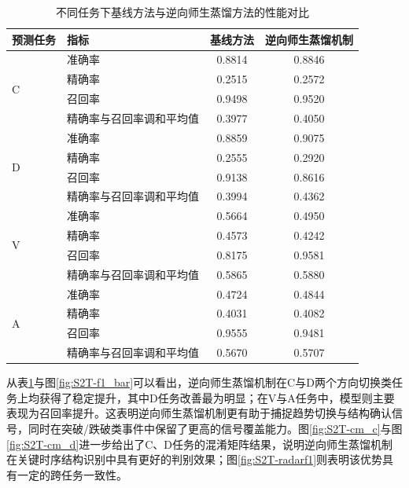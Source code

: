 \begin{table}[htbp]
\centering
\caption{不同任务下基线方法与逆向师生蒸馏方法的性能对比}
\label{tab:s2t-performance}
\begin{tabular}{llcc}
\hline
\textbf{预测任务} & \textbf{指标} & \textbf{基线方法} & \textbf{逆向师生蒸馏机制} \\
\hline
\multirow{4}{*}{C} & 准确率  & 0.8814 & 0.8846 \\
                   & 精确率 & 0.2515 & 0.2572 \\
                   & 召回率    & 0.9498 & 0.9520 \\
                   & 精确率与召回率调和平均值        & 0.3977 & 0.4050 \\
\hline
\multirow{4}{*}{D} & 准确率  & 0.8859 & 0.9075 \\
                   & 精确率 & 0.2555 & 0.2920 \\
                   & 召回率    & 0.9138 & 0.8616 \\
                   & 精确率与召回率调和平均值        & 0.3994 & 0.4362 \\
\hline
\multirow{4}{*}{V} & 准确率  & 0.5664 & 0.4950 \\
                   & 精确率 & 0.4573 & 0.4242 \\
                   & 召回率    & 0.8175 & 0.9581 \\
                   & 精确率与召回率调和平均值        & 0.5865 & 0.5880 \\
\hline
\multirow{4}{*}{A} & 准确率  & 0.4724 & 0.4844 \\
                   & 精确率 & 0.4031 & 0.4082 \\
                   & 召回率    & 0.9555 & 0.9481 \\
                   & 精确率与召回率调和平均值        & 0.5670 & 0.5707 \\
\hline
\end{tabular}
\end{table}

从表\ref{tab:s2t-performance}与图\ref{fig:S2T-f1_bar}可以看出，逆向师生蒸馏机制在C与D两个方向切换类任务上均获得了稳定提升，其中D任务改善最为明显；在V与A任务中，模型则主要表现为召回率提升。这表明逆向师生蒸馏机制更有助于捕捉趋势切换与结构确认信号，同时在突破/跌破类事件中保留了更高的信号覆盖能力。图\ref{fig:S2T-cm_c}与图\ref{fig:S2T-cm_d}进一步给出了C、D任务的混淆矩阵结果，说明逆向师生蒸馏机制在关键时序结构识别中具有更好的判别效果；图\ref{fig:S2T-radarf1}则表明该优势具有一定的跨任务一致性。


